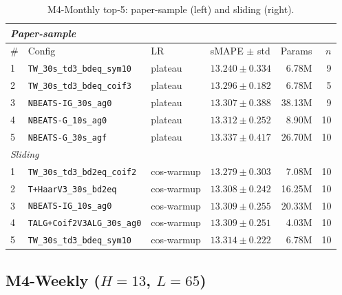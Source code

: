 \documentclass{article}
\begin{document}
\begin{table}[h]
\centering
\scriptsize
\setlength{\tabcolsep}{2.5pt}
\caption{M4-Monthly top-5: paper-sample (left) and sliding (right).}
\label{tab:m4_monthly_full}
\begin{tabular}{@{}llllrr@{}}
\toprule
\multicolumn{6}{l}{\textit{Paper-sample}} \\
\midrule
\# & Config & LR & sMAPE $\pm$ std & Params & $n$ \\
\midrule
1 & \texttt{TW\_30s\_td3\_bdeq\_sym10}      & plateau & $\mathbf{13.240 \pm 0.334}$ & 6.78M  & 9 \\
2 & \texttt{TW\_30s\_td3\_bdeq\_coif3}      & plateau & $13.296 \pm 0.182$          & 6.78M  & 5 \\
3 & \texttt{NBEATS-IG\_30s\_ag0}            & plateau & $13.307 \pm 0.388$          & 38.13M & 9 \\
4 & \texttt{NBEATS-G\_10s\_ag0}             & plateau & $13.312 \pm 0.252$          & 8.90M  & 10 \\
5 & \texttt{NBEATS-G\_30s\_agf}             & plateau & $13.337 \pm 0.417$          & 26.70M & 10 \\
\midrule
\multicolumn{6}{l}{\textit{Sliding}} \\
\midrule
1 & \texttt{TW\_30s\_td3\_bd2eq\_coif2}     & cos-warmup & $\mathbf{13.279 \pm 0.303}$ & 7.08M  & 10 \\
2 & \texttt{T+HaarV3\_30s\_bd2eq}           & cos-warmup & $13.308 \pm 0.242$          & 16.25M & 10 \\
3 & \texttt{NBEATS-IG\_10s\_ag0}            & cos-warmup & $13.309 \pm 0.255$          & 20.33M & 10 \\
4 & \texttt{TALG+Coif2V3ALG\_30s\_ag0}      & cos-warmup & $13.309 \pm 0.251$          & 4.03M  & 10 \\
5 & \texttt{TW\_30s\_td3\_bdeq\_sym10}      & cos-warmup & $13.314 \pm 0.222$          & 6.78M  & 10 \\
\bottomrule
\end{tabular}
\end{table}

\subsection{\texorpdfstring{M4-Weekly ($H=13$, $L=65$)}{M4-Weekly (H=13, L=65)}}
\end{document}
